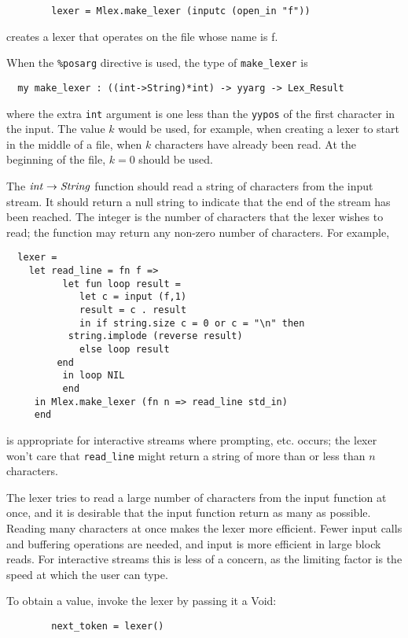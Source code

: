 \begin{verbatim}
        lexer = Mlex.make_lexer (inputc (open_in "f"))
\end{verbatim}

creates a lexer that operates on the file whose name is f.

When the {\tt \%posarg} directive is used, the type of
{\tt make_lexer} is 
\begin{verbatim}
  my make_lexer : ((int->String)*int) -> yyarg -> Lex_Result
\end{verbatim}
where the extra {\tt int} argument is one less than the {\tt yypos}
of the first character in the input.  The value $k$ would be used,
for example, when creating
a lexer to start in the middle of a file, when $k$ characters have
already been read.  At the beginning of the file, $k=0$ should be used.

The ${\it int} \rightarrow {\it String}$ function
should read a string of characters
from the input stream.  It should return a null string to indicate
that the end of the stream has been reached.  The integer is the
number of characters that the lexer wishes to read; the function may
return any non-zero number of characters.  For example, 

\begin{verbatim}
  lexer = 
    let read_line = fn f =>
          let fun loop result =
             let c = input (f,1)
	         result = c . result
             in if string.size c = 0 or c = "\n" then
	  	   string.implode (reverse result)
	         else loop result
	     end
          in loop NIL
          end
     in Mlex.make_lexer (fn n => read_line std_in)
     end
\end{verbatim}

is appropriate for interactive streams where prompting, etc.  occurs;
the lexer won't care that \verb|read_line| might return a string of more
than or less than $n$ characters.

The lexer tries to read a large number of characters from the input
function at once, and it is desirable that the input function return
as many as possible.  Reading many characters at once makes the lexer
more efficient.  Fewer input calls and buffering operations are
needed, and input is more efficient in large block reads.  For
interactive streams this is less of a concern, as the limiting factor
is the speed at which the user can type.

To obtain a value, invoke the lexer by passing it a Void:

\begin{verbatim}
        next_token = lexer()
\end{verbatim}

